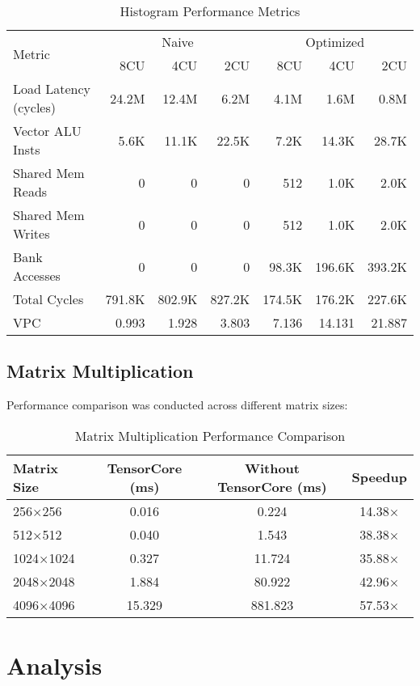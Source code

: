 \documentclass[9pt]{IEEEtran}
\begin{document}
\begin{table}[htbp]
\centering
\footnotesize
\setlength{\tabcolsep}{3pt}
\caption{Histogram Performance Metrics}
\begin{tabular}{@{}lrrrrrr@{}}
\toprule
\multirow{2}{*}{Metric} & \multicolumn{3}{c}{Naive} & \multicolumn{3}{c}{Optimized} \\
\cmidrule(lr){2-4} \cmidrule(lr){5-7}
 & 8CU & 4CU & 2CU & 8CU & 4CU & 2CU \\
\midrule
Load Latency (cycles) & 24.2M & 12.4M & 6.2M & 4.1M & 1.6M & 0.8M \\
Vector ALU Insts & 5.6K & 11.1K & 22.5K & 7.2K & 14.3K & 28.7K \\
Shared Mem Reads & 0 & 0 & 0 & 512 & 1.0K & 2.0K \\
Shared Mem Writes & 0 & 0 & 0 & 512 & 1.0K & 2.0K \\
Bank Accesses & 0 & 0 & 0 & 98.3K & 196.6K & 393.2K \\
Total Cycles & 791.8K & 802.9K & 827.2K & 174.5K & 176.2K & 227.6K \\
VPC & 0.993 & 1.928 & 3.803 & 7.136 & 14.131 & 21.887 \\
\bottomrule
\end{tabular}
\end{table}

\subsection{Matrix Multiplication}
Performance comparison was conducted across different matrix sizes:

\begin{table}[htbp]
\centering
\caption{Matrix Multiplication Performance Comparison}
\begin{tabular}{@{}lccc@{}}
\toprule
Matrix Size & TensorCore (ms) & Without TensorCore (ms) & Speedup \\
\midrule
256×256 & 0.016 & 0.224 & 14.38× \\
512×512 & 0.040 & 1.543 & 38.38× \\
1024×1024 & 0.327 & 11.724 & 35.88× \\
2048×2048 & 1.884 & 80.922 & 42.96× \\
4096×4096 & 15.329 & 881.823 & 57.53× \\
\bottomrule
\end{tabular}
\end{table}

\section{Analysis}
\end{document}
